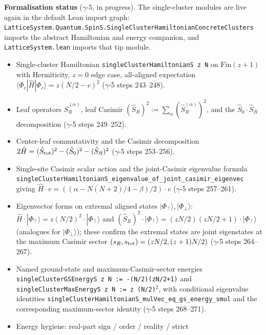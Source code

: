 \documentclass[a4paper,11pt]{article}
\begin{document}
\textbf{Formalisation status} ($\gamma$-5, in progress).  The
single-cluster modules are live again in the default Lean import graph:
\texttt{LatticeSystem.Quantum.SpinS.SingleClusterHamiltonianConcreteClusters}
imports the abstract Hamiltonian and energy companion, and
\texttt{LatticeSystem.lean} imports that tip module.

\begin{itemize}
  \item Single-cluster Hamiltonian
        \texttt{singleClusterHamiltonianS z N} on $\mathrm{Fin}(z+1)$
        with Hermiticity, $z=0$ edge case, all-aligned
        expectation $\langle \Phi_c | \hat H | \Phi_c\rangle =
        z(N/2 - c)^2$ ($\gamma$-5 steps 243--248).
  \item Leaf operators $\hat S_R^{(\alpha)}$, leaf Casimir
        $(\hat S_R)^2 := \sum_\alpha (\hat S_R^{(\alpha)})^2$,
        and the $\hat S_0 \cdot \hat S_R$ decomposition
        ($\gamma$-5 steps 249--252).
  \item Center-leaf commutativity and the Casimir decomposition
        $2 \hat H = (\hat S_{\rm tot})^2 - (\hat S_0)^2
        - (\hat S_R)^2$ ($\gamma$-5 steps 253--256).
  \item Single-site Casimir scalar action and the joint-Casimir
        eigenvalue formula
        \texttt{singleClusterHamiltonianS\_eigenvalue\_of\_joint\_casimir\_eigenvec}
        giving $\hat H \cdot v = ((\alpha - N(N+2)/4 - \beta)/2) \cdot v$
        ($\gamma$-5 steps 257--261).
  \item Eigenvector forms on extremal aligned states
        $|\Phi_\top\rangle, |\Phi_\bot\rangle$:
        $\hat H \cdot |\Phi_\top\rangle =
        z(N/2)^2 \cdot |\Phi_\top\rangle$ and
        $(\hat S_R)^2 \cdot |\Phi_\top\rangle =
        (zN/2)(zN/2+1) \cdot |\Phi_\top\rangle$
        (analogues for $|\Phi_\bot\rangle$); these confirm the
        extremal states are joint eigenstates at the maximum
        Casimir sector $(s_R, s_{\rm tot}) = (zN/2, (z+1)N/2)$
        ($\gamma$-5 steps 264--267).
  \item Named ground-state and maximum-Casimir-sector energies
        \texttt{singleClusterGSEnergyS z N := -(N/2)(zN/2+1)} and
        \texttt{singleClusterMaxEnergyS z N := z (N/2)$^2$},
        with conditional eigenvalue identities
        \texttt{singleClusterHamiltonianS\_mulVec\_eq\_gs\_energy\_smul}
        and the corresponding maximum-sector identity
        ($\gamma$-5 steps 268--271).
  \item Energy hygiene: real-part sign / order / reality / strict

\end{itemize}
\end{document}
